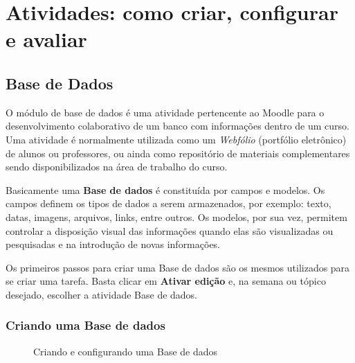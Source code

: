 \chapter{Atividades: como criar, configurar e avaliar}


\section{Base de Dados}
O módulo de base de dados é uma atividade pertencente ao Moodle para o desenvolvimento colaborativo de um banco com informações dentro de um curso. Uma atividade é normalmente utilizada como um \textit{Webfólio} (portfólio eletrônico) de alunos ou professores, ou ainda como repositório de materiais complementares sendo disponibilizados na área de trabalho do curso.

Basicamente uma \textbf{Base de dados} é constituída por campos e modelos. Os campos definem os tipos de dados a serem armazenados, por exemplo: texto, datas, imagens, arquivos, links, entre outros. Os modelos, por sua vez, permitem controlar a disposição visual das informações quando elas são visualizadas ou pesquisadas e na introdução de novas informações.

Os primeiros passos para criar uma Base de dados são os mesmos utilizados para se criar uma tarefa. Basta clicar em \textbf{Ativar edição} e, na semana ou tópico desejado, escolher a atividade Base de dados.

\subsection{Criando uma Base de dados}

\begin{figure}[htbp]
 \begin{center}
  \caption{Criando e configurando uma Base de dados}
  \label{fig:cap5_1}
 \end{center}
\end{figure}

